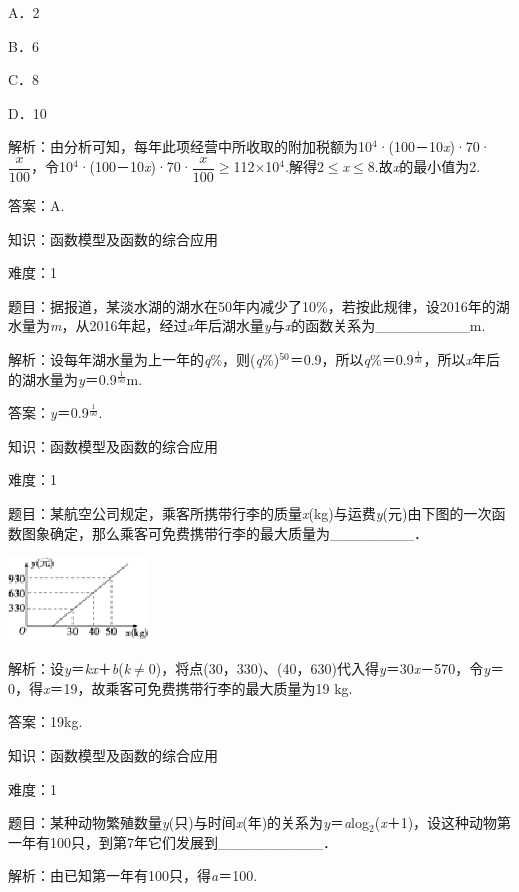 \documentclass{article} %
\begin{document}
A．2   

B．6

C．8   

D．10

解析：由分析可知，每年此项经营中所收取的附加税额为10${}^{4}$·(100－10\textit{x})·70·$\dfrac{x}{100}$，令10${}^{4}$·(100－10\textit{x})·70·$\dfrac{x}{100}$$\mathrm{\ge}$112$\mathrm{\times}$10${}^{4}$.解得2$\mathrm{\le}$\textit{x}$\mathrm{\le}$8.故\textit{x}的最小值为2.

答案：A.

知识：函数模型及函数的综合应用

难度：1

题目：据报道，某淡水湖的湖水在50年内减少了10\%，若按此规律，设2016年的湖水量为\textit{m}，从2016年起，经过\textit{x}年后湖水量\textit{y}与\textit{x}的函数关系为\_\_\_\_\_\_\_\_\_m.

解析：设每年湖水量为上一年的\textit{q}\%，则(\textit{q}\%)${}^{50}$＝0.9，所以\textit{q}\%＝0.9$^{\frac{1}{50}}$，所以\textit{x}年后的湖水量为\textit{y}＝0.9$^{\frac{1}{50}}$m.

答案：\textit{y}＝0.9$^{\frac{1}{50}}$.

知识：函数模型及函数的综合应用

难度：1

题目：某航空公司规定，乘客所携带行李的质量\textit{x}(kg)与运费\textit{y}(元)由下图的一次函数图象确定，那么乘客可免费携带行李的最大质量为\_\_\_\_\_\_\_\_．

\includegraphics*[width=1.47in, height=0.87in, keepaspectratio=false]{image75}

解析：设\textit{y}＝\textit{kx}＋\textit{b}(\textit{k}$\mathrm{\neq}$0)，将点(30，330)、(40，630)代入得\textit{y}＝30\textit{x}－570，令\textit{y}＝0，得\textit{x}＝19，故乘客可免费携带行李的最大质量为19 kg.

答案：19kg.

知识：函数模型及函数的综合应用

难度：1

题目：某种动物繁殖数量\textit{y}(只)与时间\textit{x}(年)的关系为\textit{y}＝\textit{a}log${}_{2}$(\textit{x}＋1)，设这种动物第一年有100只，到第7年它们发展到\_\_\_\_\_\_\_\_\_\_．

解析：由已知第一年有100只，得\textit{a}＝100.
\end{document}
